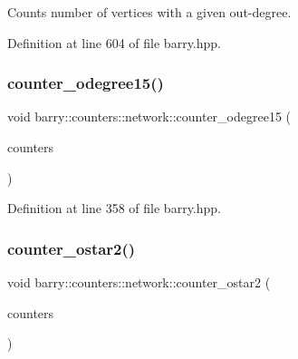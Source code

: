 Counts number of vertices with a given out-\/degree. 



Definition at line 604 of file barry.\+hpp.

\mbox{\label{namespacebarry_1_1counters_1_1network_a7a43854f3227f5f92d3ff580e99c7136}} 
\subsubsection{\texorpdfstring{counter\+\_\+odegree15()}{counter\_odegree15()}}
{\footnotesize\ttfamily void barry\+::counters\+::network\+::counter\+\_\+odegree15 (\begin{DoxyParamCaption}\item[{\hyperlink{namespacebarry_1_1counters_1_1network_a3b3c590303d47840d1967372ae495d95}{Net\+Counter\+Vector} $\ast$}]{counters }\end{DoxyParamCaption})\hspace{0.3cm}{\ttfamily [inline]}}



Definition at line 358 of file barry.\+hpp.

\mbox{\label{namespacebarry_1_1counters_1_1network_af76d9df31e55422bdffdb9e56870a46f}} 
\subsubsection{\texorpdfstring{counter\+\_\+ostar2()}{counter\_ostar2()}}
{\footnotesize\ttfamily void barry\+::counters\+::network\+::counter\+\_\+ostar2 (\begin{DoxyParamCaption}\item[{\hyperlink{namespacebarry_1_1counters_1_1network_a3b3c590303d47840d1967372ae495d95}{Net\+Counter\+Vector} $\ast$}]{counters }\end{DoxyParamCaption})\hspace{0.3cm}{\ttfamily [inline]}}



